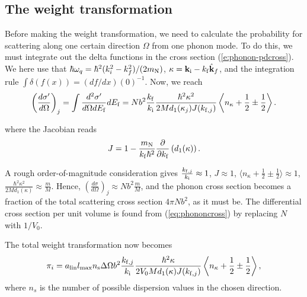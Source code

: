 \subsection{The weight transformation}
Before making the weight transformation, we need to calculate the
probability for scattering along one certain direction $\Omega$
from one phonon mode. To do this, we must integrate out the delta
functions in the cross section (\ref{e:phonon-pdcross}).
We here use that $\hbar \omega_q = \hbar^2 (k_i^2 - k_f^2) / (2 m_{\rm N})$,
$\kappa = {\bf k}_{\rm i} - k_{\rm f}\hat{\bf k}_f$, and
the integration rule $\int \delta(f(x)) = (df/dx)(0)^{-1}$.
Now, we reach
\begin{equation} \label{eq:phononcross}
\left(\frac{d\sigma'}{d\Omega}\right)_j = \int \frac{d^2\sigma'}{d\Omega dE_{\rm f}} dE_{\rm f}
 = N b^2 \frac{k_{\rm f}}{k_{\rm i}} 
\frac{\hbar^2 \kappa^2}{2M d_1(\kappa_j) J(k_{{\rm f},j})} 
\left\langle n_{\kappa}+\frac12\pm\frac12 \right\rangle . 
\end{equation}

where the Jacobian reads
\begin{equation}
J = 1 - \frac{m_{\rm N}}{k_{\rm f} \hbar^2} 
    \frac{\partial}{\partial k_{\rm f}} \left( d_1(\kappa) \right) .
\end{equation}

A rough order-of-magnitude consideration gives
$\frac{k_{{\rm f},j}}{k_{\rm i}}\approx 1$,
$J \approx 1$,
$\langle n_{\kappa}+\frac12\pm\frac12 \rangle \approx 1$,
$\frac{\hbar^2\kappa^2}{2M d_1(\kappa)}
\approx \frac{m}{M}$.
Hence, $\left(\frac{d\sigma}{d\Omega}\right)_j \approx N b^2 \frac{m}{M}$, and
the phonon cross section becomes a fraction of 
the total scattering cross section $4 \pi N b^2$, as it must be.
The differential cross section per unit volume is found from 
(\ref{eq:phononcross}) by replacing $N$ with $1/V_0$.

The total weight transformation now becomes
\begin{equation} \label{eq:phonon_mult}
\pi_i = a_{\rm lin} l_{\rm max} n_{\rm s} \Delta \Omega
 b^2 \frac{k_{{\rm f},j}}{k_{\rm i}}
 \frac{\hbar^2 \kappa}{2 V_0 M d_1(\kappa) J(k_{{\rm f},j})} 
 \left\langle n_{\kappa}+\frac12 \pm\frac12 \right\rangle ,
\end{equation}
where $n_s$ is the number of possible dispersion values in the chosen direction.
